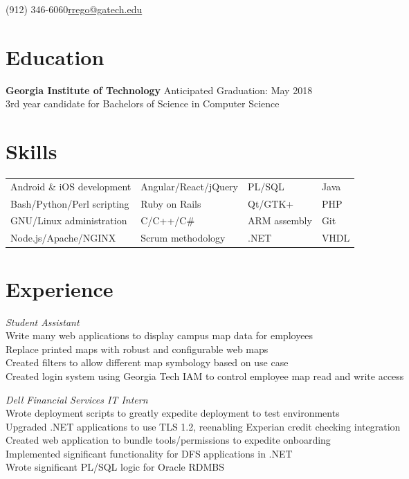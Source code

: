 \documentclass[line]{resume}
\begin{document}
\begin{center}
 {(912) 346-6060}{\href{mailto:rrego@gatech.edu}{rrego@gatech.edu}}
\end{center}
\section{Education}
\textbf{Georgia Institute of Technology} \hfill Anticipated Graduation: May 2018  \\
3rd year candidate for Bachelors of Science in Computer Science
\section{Skills}
\begin{tabular}{l l l l} Android \& iOS development & Angular/React/jQuery & PL/SQL & Java \\
	Bash/Python/Perl scripting & Ruby on Rails & Qt/GTK+ & PHP \\
	GNU/Linux administration & C/C++/C\# & ARM assembly & Git \\
	Node.js/Apache/NGINX & Scrum methodology & .NET & VHDL
\end{tabular}
\section{Experience}
\textit{Student Assistant} \\
Write many web applications to display campus map data for employees\\
Replace printed maps with robust and configurable web maps\\
Created filters to allow different map symbology based on use case\\
Created login system using Georgia Tech IAM to control employee map read and write access 

\textit{Dell Financial Services IT Intern} \\
Wrote deployment scripts to greatly expedite deployment to test environments \\
Upgraded .NET applications to use TLS 1.2, reenabling Experian credit checking integration \\
Created web application to bundle tools/permissions to expedite onboarding \\
Implemented significant functionality for DFS applications in .NET \\
Wrote significant PL/SQL logic for Oracle RDMBS
\end{document}
